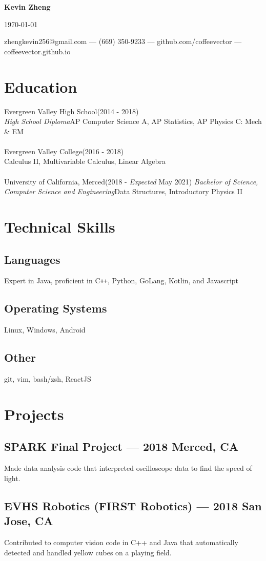 \documentclass[letterpaper,12pt]{article}
\makeatletter
\newcommand\textbox[1]{%
	\parbox{.333\textwidth}{#1}%
}
\renewcommand{\maketitle}{
	\begin{center}
		\noindent\textbox{\hfill}\textbox{\hfil\bfseries\huge Kevin Zheng\hfil}\textbox{\hfill \today}
		{zhengkevin256@gmail.com --- (669) 350-9233 --- github.com/coffeevector --- coffeevector.github.io}
	\end{center} }
\makeatother
\begin{document}
\maketitle
\section{Education}
Evergreen Valley High School\null\hfill (2014 - 2018)\\
\emph{High School Diploma}\null\hfill AP Computer Science A, AP Statistics, AP Physics C: Mech \& EM\\~\\
Evergreen Valley College\null\hfill (2016 - 2018)\\
\null\hfill Calculus II, Multivariable Calculus, Linear Algebra\\~\\
University of California, Merced\null\hfill(2018 - \emph{Expected} May 2021)\newline
\emph{Bachelor of Science, Computer Science and Engineering}\null\hfill Data Structures, Introductory Physics II
\section{Technical Skills}
\subsection{Languages}
Expert in Java, proficient in C\verb!++!, Python, GoLang, Kotlin, and Javascript
\subsection{Operating Systems}
Linux, Windows, Android
\vspace*{-2mm}
\subsection{Other}
git, vim, bash/zsh, ReactJS
\section{Projects}
	\subsection{SPARK Final Project --- 2018 \null\hfill Merced, CA}
	\par Made data analysis code that interpreted oscilloscope data to find the speed of light.
	\subsection{EVHS Robotics (FIRST Robotics) --- 2018 \null\hfill San Jose, CA}
	\par Contributed to computer vision code in C++ and Java that automatically detected and handled yellow cubes on a playing field.
\end{document}
